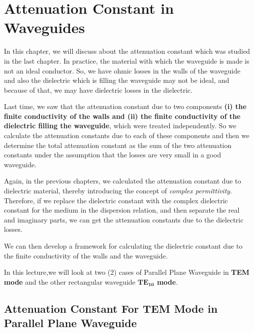 \chapter{Attenuation Constant in Waveguides}
In this chapter, we will discuss about the attenuation constant which was studied in the last chapter. In practice, the material with which the waveguide is made is not an ideal conductor. So, we have ohmic losses in the walls of the waveguide and also the dielectric which is filling the waveguide may not be ideal, and because of that, we may have dielectric losses in the dielectric.

Last time, we saw that the attenuation constant due to two components \textbf{(i) the finite conductivity of the walls and (ii) the finite conductivity of the dielectric filling the waveguide}, which were treated independently. So we calculate the attenuation constants due to each of these components and then we determine the total attenuation constant as the sum of the two attenuation constants under the assumption that the losses are very small in a good waveguide.

Again, in the previous chapters, we calculated the attenuation constant due to dielectric material, thereby introducing the concept of \emph{complex permittivity}. Therefore, if we replace the dielectric constant with the complex dielectric constant for the medium in the dispersion relation, and then separate the real and imaginary parts, we can get the attenuation constants due to the dielectric losses.

We can then develop a framework for calculating the dielectric constant due to the finite conductivity of the walls and the waveguide.

In this lecture,we will look at two (2) cases of Parallel Plane Waveguide in \textbf{TEM mode} and the other rectangular waveguide \textbf{$\boldsymbol{TE_{10}}$ mode}.

\section{Attenuation Constant For TEM Mode in Parallel Plane Waveguide}

